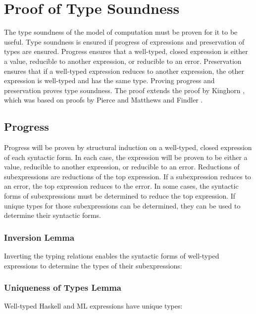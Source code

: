 \chapter{Proof of Type Soundness}

The type soundness of the model of computation must be proven for it to be useful.  Type soundness is ensured if progress of expressions and preservation of types are ensured.  Progress ensures that a well-typed, closed expression is either a value, reducible to another expression, or reducible to an error.  Preservation ensures that if a well-typed expression reduces to another expression, the other expression is well-typed and has the same type.  Proving progress and preservation proves type soundness.  The proof extends the proof by Kinghorn \cite{kinghorn07}, which was based on proofs by Pierce \cite{pierce02} and Matthews and Findler \cite{matthews07}.

\section{Progress}

Progress will be proven by structural induction on a well-typed, closed expression of each syntactic form.  In each case, the expression will be proven to be either a value, reducible to another expression, or reducible to an error.  Reductions of subexpressions are reductions of the top expression.  If a subexpression reduces to an error, the top expression reduces to the error.  In some cases, the syntactic forms of subexpressions must be determined to reduce the top expression.  If unique types for those subexpressions can be determined, they can be used to determine their syntactic forms.

\subsection{Inversion Lemma}

Inverting the typing relations enables the syntactic forms of well-typed expressions to determine the types of their subexpressions:



\subsection{Uniqueness of Types Lemma}

Well-typed Haskell and ML expressions have unique types:

